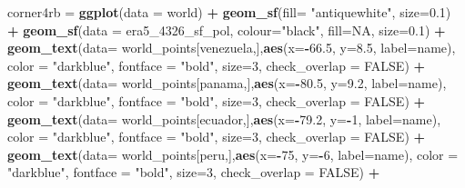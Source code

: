 \documentclass[12pt,twoside]{reedthesis}
\newenvironment{Shaded}{\begin{snugshade}}{\end{snugshade}}
\newcommand{\DataTypeTok}[1]{\textcolor[rgb]{0.13,0.29,0.53}{#1}}
\newcommand{\DecValTok}[1]{\textcolor[rgb]{0.00,0.00,0.81}{#1}}
\newcommand{\FloatTok}[1]{\textcolor[rgb]{0.00,0.00,0.81}{#1}}
\newcommand{\KeywordTok}[1]{\textcolor[rgb]{0.13,0.29,0.53}{\textbf{#1}}}
\newcommand{\NormalTok}[1]{#1}
\newcommand{\OperatorTok}[1]{\textcolor[rgb]{0.81,0.36,0.00}{\textbf{#1}}}
\newcommand{\OtherTok}[1]{\textcolor[rgb]{0.56,0.35,0.01}{#1}}
\newcommand{\StringTok}[1]{\textcolor[rgb]{0.31,0.60,0.02}{#1}}
\begin{document}
\begin{Shaded}
\begin{Highlighting}[]
\NormalTok{corner4rb =}\StringTok{ }\KeywordTok{ggplot}\NormalTok{(}\DataTypeTok{data =}\NormalTok{ world) }\OperatorTok{+}\StringTok{ }
\StringTok{  }\KeywordTok{geom_sf}\NormalTok{(}\DataTypeTok{fill=} \StringTok{"antiquewhite"}\NormalTok{,  }\DataTypeTok{size=}\FloatTok{0.1}\NormalTok{) }\OperatorTok{+}\StringTok{ }
\StringTok{  }\KeywordTok{geom_sf}\NormalTok{(}\DataTypeTok{data =}\NormalTok{ era5_}\DecValTok{4326}\NormalTok{_sf_pol, }\DataTypeTok{colour=}\StringTok{"black"}\NormalTok{, }\DataTypeTok{fill=}\OtherTok{NA}\NormalTok{, }\DataTypeTok{size=}\FloatTok{0.1}\NormalTok{) }\OperatorTok{+}\StringTok{ }
\StringTok{  }\KeywordTok{geom_text}\NormalTok{(}\DataTypeTok{data=}\NormalTok{ world_points[venezuela,],}\KeywordTok{aes}\NormalTok{(}\DataTypeTok{x=}\OperatorTok{-}\FloatTok{66.5}\NormalTok{, }\DataTypeTok{y=}\FloatTok{8.5}\NormalTok{, }\DataTypeTok{label=}\NormalTok{name), }\DataTypeTok{color =} \StringTok{"darkblue"}\NormalTok{, }\DataTypeTok{fontface =} \StringTok{"bold"}\NormalTok{, }\DataTypeTok{size=}\DecValTok{3}\NormalTok{, }\DataTypeTok{check_overlap =} \OtherTok{FALSE}\NormalTok{) }\OperatorTok{+}
\StringTok{  }\KeywordTok{geom_text}\NormalTok{(}\DataTypeTok{data=}\NormalTok{ world_points[panama,],}\KeywordTok{aes}\NormalTok{(}\DataTypeTok{x=}\OperatorTok{-}\FloatTok{80.5}\NormalTok{, }\DataTypeTok{y=}\FloatTok{9.2}\NormalTok{, }\DataTypeTok{label=}\NormalTok{name), }\DataTypeTok{color =} \StringTok{"darkblue"}\NormalTok{, }\DataTypeTok{fontface =} \StringTok{"bold"}\NormalTok{, }\DataTypeTok{size=}\DecValTok{3}\NormalTok{, }\DataTypeTok{check_overlap =} \OtherTok{FALSE}\NormalTok{) }\OperatorTok{+}\StringTok{ }
\StringTok{  }\KeywordTok{geom_text}\NormalTok{(}\DataTypeTok{data=}\NormalTok{ world_points[ecuador,],}\KeywordTok{aes}\NormalTok{(}\DataTypeTok{x=}\OperatorTok{-}\FloatTok{79.2}\NormalTok{, }\DataTypeTok{y=}\OperatorTok{-}\DecValTok{1}\NormalTok{, }\DataTypeTok{label=}\NormalTok{name), }\DataTypeTok{color =} \StringTok{"darkblue"}\NormalTok{, }\DataTypeTok{fontface =} \StringTok{"bold"}\NormalTok{, }\DataTypeTok{size=}\DecValTok{3}\NormalTok{, }\DataTypeTok{check_overlap =} \OtherTok{FALSE}\NormalTok{) }\OperatorTok{+}
\StringTok{  }\KeywordTok{geom_text}\NormalTok{(}\DataTypeTok{data=}\NormalTok{ world_points[peru,],}\KeywordTok{aes}\NormalTok{(}\DataTypeTok{x=}\OperatorTok{-}\DecValTok{75}\NormalTok{, }\DataTypeTok{y=}\OperatorTok{-}\DecValTok{6}\NormalTok{, }\DataTypeTok{label=}\NormalTok{name), }\DataTypeTok{color =} \StringTok{"darkblue"}\NormalTok{, }\DataTypeTok{fontface =} \StringTok{"bold"}\NormalTok{, }\DataTypeTok{size=}\DecValTok{3}\NormalTok{, }\DataTypeTok{check_overlap =} \OtherTok{FALSE}\NormalTok{) }\OperatorTok{+}

\end{Highlighting}
\end{Shaded}
\end{document}
